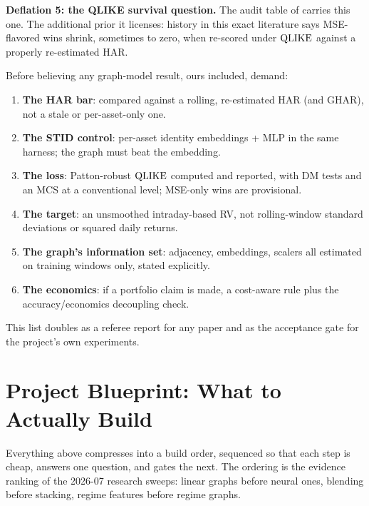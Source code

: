 \textbf{Deflation 5: the QLIKE survival question.} The audit table of  carries this one. The additional prior it licenses: history in this exact literature says MSE-flavored wins shrink, sometimes to zero, when re-scored under $\operatorname{QLIKE}$ against a properly re-estimated HAR.

\begin{keyidea}
Before believing any graph-model result, ours included, demand:
\begin{enumerate}[nosep]
  \item \textbf{The HAR bar}: compared against a rolling, re-estimated HAR (and GHAR), not a stale or per-asset-only one.
  \item \textbf{The STID control}: per-asset identity embeddings + MLP in the same harness; the graph must beat the embedding.
  \item \textbf{The loss}: Patton-robust $\operatorname{QLIKE}$ computed and reported, with DM tests and an MCS at a conventional level; MSE-only wins are provisional.
  \item \textbf{The target}: an unsmoothed intraday-based RV, not rolling-window standard deviations or squared daily returns.
  \item \textbf{The graph's information set}: adjacency, embeddings, scalers all estimated on training windows only, stated explicitly.
  \item \textbf{The economics}: if a portfolio claim is made, a cost-aware rule plus the accuracy/economics decoupling check.
\end{enumerate}
This list doubles as a referee report for any paper and as the acceptance gate for the project's own experiments.
\end{keyidea}

\section{Project Blueprint: What to Actually Build}\label{sec:gnn:blueprint}

Everything above compresses into a build order, sequenced so that each step is cheap, answers one question, and gates the next. The ordering is the evidence ranking of the 2026-07 research sweeps: linear graphs before neural ones, blending before stacking, regime features before regime graphs.


